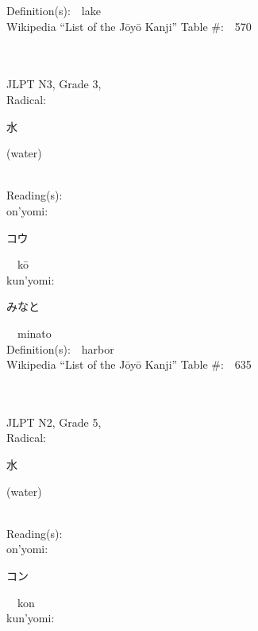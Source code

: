 \begin{multicols}{2}
Definition(s):\ \ lake \\
Wikipedia ``List of the J\=oy\=o Kanji'' Table \#:\ \ 570 \\
\ \ \\
{\fontsize{34pt}{40pt}  }\ \ \\  %
{JLPT N3, Grade 3, \\Radical:\ \ {\begin{CJK}{UTF8}{min} 水 \end{CJK}} (water) } \\
Reading(s):\ \ \\
{\hspace*{1em}}on'yomi:\ \ \\
{\hspace*{2em}}{\begin{CJK}{UTF8}{min} コウ \end{CJK}}\ \ k\=o\ \ \\
{\hspace*{1em}}kun'yomi:\ \ \\
{\hspace*{2em}}{\begin{CJK}{UTF8}{min} みなと \end{CJK}}\ \ minato\ \ \\
Definition(s):\ \ harbor \\
Wikipedia ``List of the J\=oy\=o Kanji'' Table \#:\ \ 635 \\
\ \ \\
{\fontsize{34pt}{40pt}  }\ \ \\  %
{JLPT N2, Grade 5, \\Radical:\ \ {\begin{CJK}{UTF8}{min} 水 \end{CJK}} (water) } \\
Reading(s):\ \ \\
{\hspace*{1em}}on'yomi:\ \ \\
{\hspace*{2em}}{\begin{CJK}{UTF8}{min} コン \end{CJK}}\ \ kon\ \ \\
{\hspace*{1em}}kun'yomi:\ \ \\

\end{multicols}

